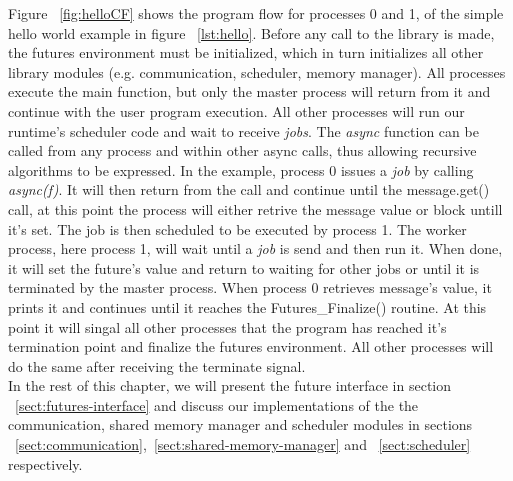 Figure ~\ref{fig:helloCF} shows the program flow for processes 0 and 1, of the simple
hello world example in figure ~\ref{lst:hello}.  Before any call to the library is made, the futures
environment must be initialized, which in turn initializes all other library modules 
(e.g. communication, scheduler, memory manager).
All processes execute the main function, but only
the master process will return from it and continue with the user program execution.
All other processes will run our runtime's scheduler code and wait to receive \emph{jobs}.
The \emph{async} function can be called from any process 
and within other async calls, thus allowing recursive algorithms to be expressed. 
In the example, process 0 issues a \emph{job} by
calling \emph{async(f)}.  It will then return from the call and continue until
the message.get() call, at this point the process will either retrive the message value or block untill
it's set.
The job is then scheduled to be executed by process 1.  The worker process,
here process 1, will wait until a \emph{job} is send and then run it.  When done, it will set 
the future's value and return to waiting for other jobs or until it is terminated by the master
process.  When process 0 retrieves message's value, it prints it and continues until it reaches
the Futures\_Finalize() routine.  At this point it will singal all other processes that the program
has reached it's termination point and finalize the futures environment.  All other processes will
do the same after receiving the terminate signal.
\\

In the rest of this chapter, we will present the future interface in section ~\ref{sect:futures-interface}
and discuss our implementations of the the communication, shared memory manager and scheduler modules in
sections ~\ref{sect:communication},~\ref{sect:shared-memory-manager} and ~\ref{sect:scheduler}
respectively.

